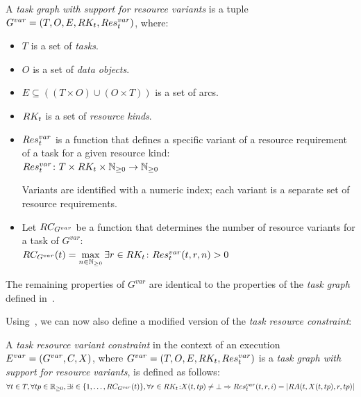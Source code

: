 \vspace{2mm} A
\emph{task graph with support for resource variants} is a tuple \\
$G^{var} = (T, O, E, RK_t, Res_t^{var})$, where:
\begin{itemize}[itemsep=0pt]
	\item $T$ is a set of \emph{tasks}.
	\item $O$ is a set of \emph{data objects}.
	\item $E \subseteq ((T\times{}O) \cup (O\times{}T))$ is a set of arcs.
	\item $RK_t$ is a set of \emph{resource kinds}.
	\item $Res_t^{var}$ is a function that defines a specific variant of a resource
	      requirement of a task for a given resource kind: \\ $Res_t^{var}\colon T \times RK_t \times
		      \mathbb{N}_{\geq{}0} \rightarrow
		      \mathbb{N}_{\geq{}0}$

	Variants are identified with a numeric index; each variant is a separate set of resource
	requirements.
	\item Let $RC_{G^{var}}$ be a function that determines the number of
	resource variants for a task of $G^{var}$: \\
	$RC_{G^{var}}(t) = \max\limits_{n\in\mathbb{N}_{\geq{}0}} \exists
		      r\in RK_t\colon Res_t^{var}(t, r, n) > 0$
\end{itemize}

The remaining properties of $G^{var}$ are identical to the properties of the
\emph{task graph} defined in~.

Using~, we can now also define a modified version of the
\emph{task resource constraint}:

\vspace{2mm} A \emph{task resource variant constraint}
in the context of an execution \vspace{1mm}\\
$E^{var} = (G^{var}, C, X)$, where $G^{var} = (T, O, E, RK_t, Res_t^{var})$ is
a \emph{task graph with support for resource variants}, is defined as follows: \vspace{1mm}\\
$\forall t\in{}T, \forall tp\in\mathbb{R}_{\geq{}0}, \exists
	i\in\{1,\ldots,RC_{G^{var}}(t)\}, \forall
	r\in{}RK_t\colon \\
X(t, tp) \neq \bot \Rightarrow Res_t^{var}(t, r, i) = |RA(t, X(t, tp), r, tp)|$

